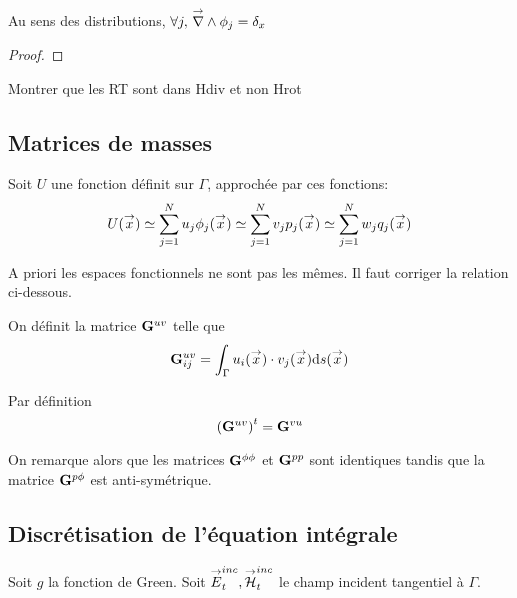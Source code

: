     \begin{prop}
      Au sens des distributions, \(\forall j,\, {\overset{\rightarrow}{\nabla}}\wedge \phi_j = \delta_x\)
    \end{prop}
    \begin{proof}
    \end{proof}

    \begin{TODO}
      Montrer que les RT sont dans Hdiv et non Hrot
    \end{TODO}

  \subsection{Matrices de masses}
    Soit \(U\) une fonction définit sur \(\Gamma\), approchée par ces fonctions: 
    \[ U({\overset{\rightarrow}{x}}) \simeq \sum\limits_{j=1}^N u_j \phi_j({\overset{\rightarrow}{x}}) \simeq \sum\limits_{j=1}^N v_j p_j({\overset{\rightarrow}{x}}) \simeq \sum\limits_{j=1}^N w_j q_j({\overset{\rightarrow}{x}})
    \]

    \begin{TODO}
      A priori les espaces fonctionnels ne sont pas les mêmes. Il faut corriger la relation ci-dessous.
    \end{TODO}

    \begin{defn}
      On définit la matrice \(\mathbf{G}^{uv}\) telle que
      \begin{equation}
        \mathbf{G}^{uv}_{ij} = \int_\Gamma u_i({\overset{\rightarrow}{x}})\cdot v_j({\overset{\rightarrow}{x}}) \mathrm{d}{s}({\overset{\rightarrow}{x}})
      \end{equation}
    \end{defn}

    \begin{prop}
      Par définition
      \begin{equation}
        \left(\mathbf{G}^{uv}\right)^t = \mathbf{G}^{vu}
      \end{equation}
    \end{prop}

    On remarque alors que les matrices \(\mathbf{G}^{\phi\phi}\) et \(\mathbf{G}^{pp}\) sont identiques tandis que la matrice \(\mathbf{G}^{p\phi}\) est anti-symétrique.

  \subsection{Discrétisation de l'équation intégrale}
    Soit \(g\) la fonction de Green. Soit \({\overset{\rightarrow}{E}}^{inc}_t,{\overset{\rightarrow}{\mathcal{H}}}^{inc}_t\) le champ incident tangentiel à \(\Gamma\).

